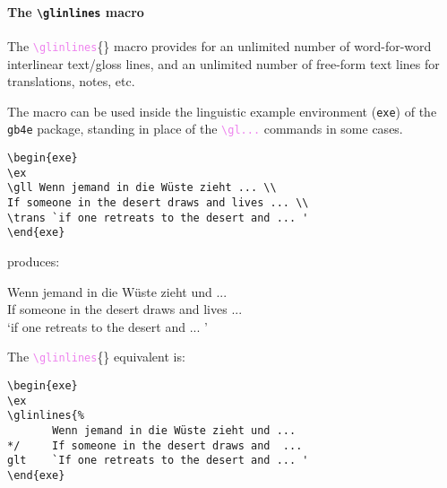 \documentclass{article}
\newcommand\para[1]{\bigskip\bigskip\paragraph{#1}}
\newcommand\glcmd[1]{\textcolor{violet}{\texttt{\textbackslash#1}}}
\newcommand\glcmdb[1]{\glcmd{#1}\{\}}
\newcommand\squiggle{%
\begin{center}
{\usefont{U}{lasy}{m}{n}\char58\char58\char58\char58\char58\char58\char58\char58\char58}
\end{center}
}
\begin{document}
%
%
%
	\mfssetpreformat{}




\para{The \texttt{\textbackslash glinlines} macro}
The \glcmdb{glinlines} macro provides for an unlimited number of word-for-word interlinear text/gloss lines, and an unlimited number of free-form text lines for translations, notes, etc.

The macro can be used inside the linguistic example environment (\verb|exe|) of the \verb|gb4e| package, standing in place of the \glcmd{gl...} commands in some cases.

\begin{verbatim}
\begin{exe}
\ex
\gll Wenn jemand in die Wüste zieht ... \\
If someone in the desert draws and lives ... \\
\trans `if one retreats to the desert and ... '
\end{exe}
\end{verbatim}

produces:

\begin{exe}
\ex
\gll Wenn jemand in die Wüste zieht und ... \\
If someone in the desert draws and lives ... \\
\trans `if one retreats to the desert and ... '
\end{exe}


The \glcmdb{glinlines} equivalent is:

\begin{verbatim}
\begin{exe}
\ex
\glinlines{%
       Wenn jemand in die Wüste zieht und ... 
*/     If someone in the desert draws and  ... 
glt    `If one retreats to the desert and ... '
\end{exe}
\end{verbatim}
\end{document}
